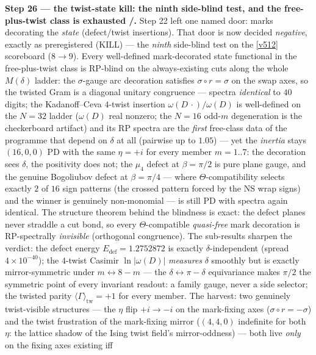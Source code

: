 \documentclass[11pt,a4paper]{article}
\theoremstyle{definition}
\begin{document}
\par\smallskip\noindent\textbf{Step 26 --- the twist-state kill: the ninth side-blind test,
and the free-plus-twist class is exhausted \mE/\mO.} Step 22 left one named door: marks
decorating the \emph{state} (defect/twist insertions). That door is now decided
\emph{negative}, exactly as preregistered (KILL) --- the \emph{ninth} side-blind test on the
\vref{v512} scoreboard ($8\to9$). Every well-defined mark-decorated state functional in the
free-plus-twist class is RP-blind on the always-existing cuts along the whole $M(\delta)$
ladder: the $\sigma$-gauge arc decoration satisfies $\sigma\circ r = \sigma$ on the swap
axes, so the twisted Gram is a diagonal unitary congruence --- spectra \emph{identical} to
$40$ digits; the Kadanoff--Ceva $4$-twist insertion $\omega(D\,\cdot)/\omega(D)$ is
well-defined on the $N = 32$ ladder ($\omega(D)$ real nonzero; the $N = 16$ odd-$m$
degeneration is the checkerboard artifact) and its RP spectra are the \emph{first} free-class
data of the programme that depend on $\delta$ at all (pairwise up to $1.05$) --- yet the
\emph{inertia} stays $(16,0,0)$ PD with the same $\eta = +i$ for every member $m = 1..7$: the
decoration sees $\delta$, the positivity does not; the $\mu_4$ defect at $\beta = \pi/2$ is
pure plane gauge, and the genuine Bogoliubov defect at $\beta = \pi/4$ --- where
$\Theta$-compatibility selects exactly $2$ of $16$ sign patterns (the crossed pattern forced
by the NS wrap signs) and the winner is genuinely non-monomial --- is still PD with spectra
again identical. The structure theorem behind the blindness is exact: the defect planes never
straddle a cut bond, so every $\Theta$-compatible \emph{quasi-free} mark decoration is
RP-spectrally \emph{invisible} (orthogonal congruence). The sub-results sharpen the verdict:
the defect energy $E_{\mathrm{def}} = 1.2752872$ is exactly $\delta$-independent (spread
$4\times10^{-40}$); the $4$-twist Casimir $\ln|\omega(D)|$ \emph{measures} $\delta$ smoothly
but is exactly mirror-symmetric under $m \leftrightarrow 8-m$ --- the $\delta \leftrightarrow
\pi - \delta$ equivariance makes $\pi/2$ the symmetric point of every invariant readout: a
family gauge, never a side selector; the twisted parity $\langle\Gamma\rangle_{\mathrm{tw}} =
+1$ for every member. The harvest: two genuinely twist-visible structures --- the $\eta$ flip
$+i \to -i$ on the mark-fixing axes ($\sigma\circ r = -\sigma$) and the twist frustration of
the mark-fixing mirror ($(4,4,0)$ indefinite for both $\eta$: the lattice shadow of the Ising
twist field's mirror-oddness) --- both live \emph{only} on the fixing axes existing iff
\end{document}
